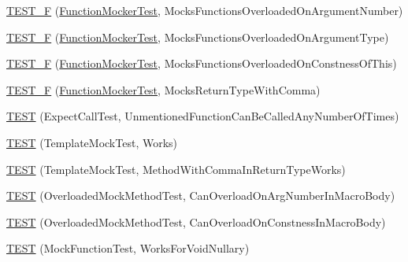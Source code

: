 \begin{DoxyCompactItemize}
\item 
\hyperlink{namespacetesting_1_1gmock__generated__function__mockers__test_a23b4f6d7bf9f6b35126ee137aa48ae3b}{T\+E\+S\+T\+\_\+F} (\hyperlink{classtesting_1_1gmock__generated__function__mockers__test_1_1_function_mocker_test}{Function\+Mocker\+Test}, Mocks\+Functions\+Overloaded\+On\+Argument\+Number)
\item 
\hyperlink{namespacetesting_1_1gmock__generated__function__mockers__test_a6fb9a5901e2d2066a9fe5a3d05c0cbe1}{T\+E\+S\+T\+\_\+F} (\hyperlink{classtesting_1_1gmock__generated__function__mockers__test_1_1_function_mocker_test}{Function\+Mocker\+Test}, Mocks\+Functions\+Overloaded\+On\+Argument\+Type)
\item 
\hyperlink{namespacetesting_1_1gmock__generated__function__mockers__test_ad580a4b2f97b3c2643794a627b347511}{T\+E\+S\+T\+\_\+F} (\hyperlink{classtesting_1_1gmock__generated__function__mockers__test_1_1_function_mocker_test}{Function\+Mocker\+Test}, Mocks\+Functions\+Overloaded\+On\+Constness\+Of\+This)
\item 
\hyperlink{namespacetesting_1_1gmock__generated__function__mockers__test_abb74ac8e211661c0d87c902f87002e6d}{T\+E\+S\+T\+\_\+F} (\hyperlink{classtesting_1_1gmock__generated__function__mockers__test_1_1_function_mocker_test}{Function\+Mocker\+Test}, Mocks\+Return\+Type\+With\+Comma)
\item 
\hyperlink{namespacetesting_1_1gmock__generated__function__mockers__test_ae0d5aa8e715f3c183f1ccdcf390187e7}{T\+E\+ST} (Expect\+Call\+Test, Unmentioned\+Function\+Can\+Be\+Called\+Any\+Number\+Of\+Times)
\item 
\hyperlink{namespacetesting_1_1gmock__generated__function__mockers__test_a5f59a7b507101fc0dbb558c090974f02}{T\+E\+ST} (Template\+Mock\+Test, Works)
\item 
\hyperlink{namespacetesting_1_1gmock__generated__function__mockers__test_aa998c7e5e8b6fd378cacb53663e8c4a6}{T\+E\+ST} (Template\+Mock\+Test, Method\+With\+Comma\+In\+Return\+Type\+Works)
\item 
\hyperlink{namespacetesting_1_1gmock__generated__function__mockers__test_a6542d3ae3f153907c32f3cf15a2ff6cf}{T\+E\+ST} (Overloaded\+Mock\+Method\+Test, Can\+Overload\+On\+Arg\+Number\+In\+Macro\+Body)
\item 
\hyperlink{namespacetesting_1_1gmock__generated__function__mockers__test_aa58ec93a77bee21244c10da2bc8cf70e}{T\+E\+ST} (Overloaded\+Mock\+Method\+Test, Can\+Overload\+On\+Constness\+In\+Macro\+Body)
\item 
\hyperlink{namespacetesting_1_1gmock__generated__function__mockers__test_a8d67aadbc04fee7e2afc10ee91a76b74}{T\+E\+ST} (Mock\+Function\+Test, Works\+For\+Void\+Nullary)

\end{DoxyCompactItemize}

